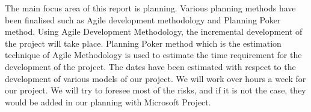 The main focus area of this report is planning. Various planning methods have been finalised such as Agile development methodology and Planning Poker method.
Using Agile Development Methodology, the incremental  development of the project will take place. Planning Poker method  which is the estimation technique of Agile Methodology is used to estimate the time requirement for the development of the project. The dates have been estimated with respect to the development of various models of our project. We will work over hours a week for our project. We will try to foresee most of the risks, and if it is not the case, they would be added in our planning with Microsoft Project. 